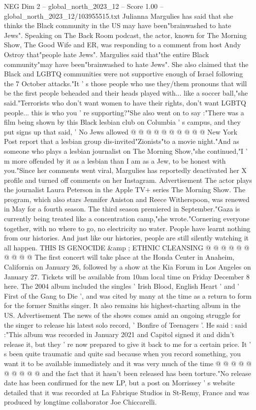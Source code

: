 \begin{textsample}{NEG Dim 2 – global\_north\_2023\_12 – Score 1.00 – global\_north\_2023\_12/103955515.txt}  \label{ex:f2_neg_208}
Julianna Margulies has said that she thinks the Black community in the US may have been"brainwashed to hate Jews".
Speaking on The Back Room podcast, the actor, known for The Morning Show, The Good Wife and ER, was responding to a comment from host Andy Ostroy that"people hate Jews".
Margulies said that"the entire Black community"may have been"brainwashed to hate Jews".
She also claimed that the Black and LGBTQ communities were not supportive enough of Israel following the 7 October attacks."It ' s those people who use they/them pronouns that will be the first people beheaded and their heads played with... like a soccer ball,"she said."Terrorists who don't want women to have their rights, don't want LGBTQ people... this is who you ' re supporting?"She also went on to say :"There was a film being shown by this Black lesbian club on Columbia ' s campus, and they put signs up that said, ' No Jews allowed @ @ @ @ @ @ @ @ @ @ New York Post report that a lesbian group dis-invited"Zionists"to a movie night."And as someone who plays a lesbian journalist on The Morning Show,"she continued,"I ' m more offended by it as a lesbian than I am as a Jew, to be honest with you."Since her comments went viral, Margulies has reportedly deactivated her X profile and turned off comments on her Instagram.
Advertisement The actor plays the journalist Laura Peterson in the Apple TV+ series The Morning Show.
The program, which also stars Jennifer Aniston and Reece Witherspoon, was renewed in May for a fourth season.
The third season premiered in September."Gaza is currently being treated like a concentration camp,"she wrote."Cornering everyone together, with no where to go, no electricity no water.
People have learnt nothing from our histories.
And just like our histories, people are still silently watching it all happen.
THIS IS GENOCIDE \&amp ; ETHNIC CLEANSING @ @ @ @ @ @ @ @ @ @ The first concert will take place at the Honda Center in Anaheim, California on January 26, followed by a show at the Kia Forum in Los Angeles on January 27.
Tickets will be available from 10am local time on Friday December 8 here.
The 2004 album included the singles ' Irish Blood, English Heart ' and ' First of the Gang to Die ', and was cited by many at the time as a return to form for the former Smiths singer.
It also remains his highest-charting album in the US.
Advertisement The news of the shows comes amid an ongoing struggle for the singer to release his latest solo record, ' Bonfire of Teenagers '.
He said : said :"This album was recorded in January 2021 and Capitol signed it and didn't release it, but they ' re now prepared to give it back to me for a certain price.
It ' s been quite traumatic and quite sad because when you record something, you want it to be available immediately and it was very much of the time @ @ @ @ @ @ @ @ @ @ and the fact that it hasn't been released has been torture."No release date has been confirmed for the new LP, but a post on Morrissey ' s website detailed that it was recorded at La Fabrique Studios in St-Remy, France and was produced by longtime collaborator Joe Chiccarelli.

\end{textsample}
